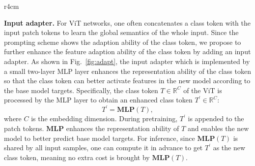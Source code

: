 \documentclass{article} \usepackage{iclr2023_conference,times}
\def\figref#1{figure~\ref{#1}}
\def\secref#1{section~\ref{#1}}
\newcommand{\myPara}[1]{\vspace{-.05in} \noindent\textbf{#1}}
\def\Real{\mathbb{R}}
\renewcommand{\figref}[1]{Fig.~\ref{#1}}\newcommand{\tabref}[1]{Tab.~\ref{#1}}\renewcommand{\secref}[1]{Section~\ref{#1}}
\begin{document}
\begin{wrapfigure}{r}{4cm}
	\centering
	\vspace{-13pt}
	\setlength{\tabcolsep}{3.8pt} \renewcommand{\arraystretch}{3.7}{ \fontsize{8.3}{1}}
	\vspace{-21pt}
	\caption{The input adapter and encoder adapter.}
	\vspace{-10pt}
	\label{fig:adapt}
\end{wrapfigure}
	\myPara{Input adapter.} 
For ViT networks, one often concatenates a class token  with the input patch tokens to learn the global semantics of the whole input. 
Since the prompting scheme shows the adaption ability of the class token, 
we propose to further enhance the feature adaption ability of the class token by adding an input adapter.  
As shown in \figref{fig:adapt},  the input adapter which is implemented by a small two-layer MLP layer enhances 
the representation ability of the class token 	so that the class token can better activate features in the new model 		according to the base model targets.
Specifically, the class token $T \in \Real^{C}$ of the ViT is processed by the MLP layer to obtain an enhanced class token $T^{'}  \in \Real^{C}$:
$$T^{'} = \mathbf{MLP}(T),$$ 
where $C$ is the embedding dimension. 
During pretraining, $T^{'}$ is appended to the patch tokens.
$\mathbf{MLP}$ enhances the representation ability of $T$ and enables the new model to better predict base model targets. 
For inference, since $\mathbf{MLP}(T)$ is shared by all input samples, 
one can compute it in advance to get $T^{'}$ as the new class token, 
meaning no extra cost is brought by $\mathbf{MLP}(T)$.
\end{document}

